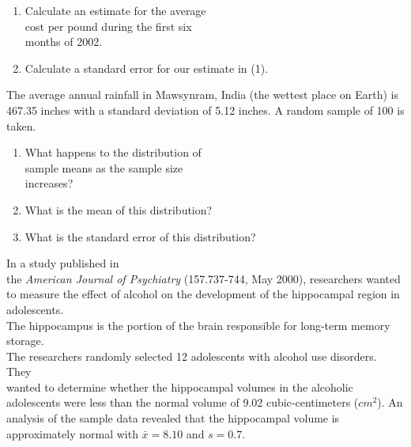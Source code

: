 \documentclass[11pt, chapterprefix=true]{scrbook}\usepackage[]{graphicx}\usepackage[]{color}
\begin{document}
\begin{exercises}
\begin{exercise}
\begin{enumerate}            
  \item Calculate an estimate for the average \\ cost per pound during the first six \\ months of 2002.
  \item Calculate a standard error for our estimate in (1).
\end{enumerate}  

\end{exercise}
\begin{solution}  %

\end{solution}

\begin{exercise}  %

The average annual rainfall in Mawsynram, India (the wettest place on Earth) is 467.35 inches with a standard deviation of 5.12 inches. A random sample of 100 is taken.

\begin{enumerate}
  \item What happens to the distribution of \\ sample means as the sample size \\ increases?
  \item What is the mean of this distribution? 
  \item What is the standard error of this distribution?
\end{enumerate}

\end{exercise}
\begin{solution}  %

\end{solution}

\begin{exercise} %



In a study published in \\ the \textit{American Journal of Psychiatry} (157.737-744, May 2000), researchers wanted to measure the effect of alcohol on the development of the hippocampal region in adolescents.  \\ The hippocampus is the portion of the brain responsible for long-term memory storage.  \\ The researchers randomly selected 12 adolescents  with alcohol use disorders.  They \\ wanted to determine whether the hippocampal volumes in the alcoholic adolescents were less than the normal volume of 9.02 cubic-centimeters  ($cm^2$).  An analysis of the sample data revealed that the hippocampal volume is approximately normal  with $\bar{x} = 8.10$ and $s = 0.7$.  


\end{exercise}
\end{exercises}
\end{document}
